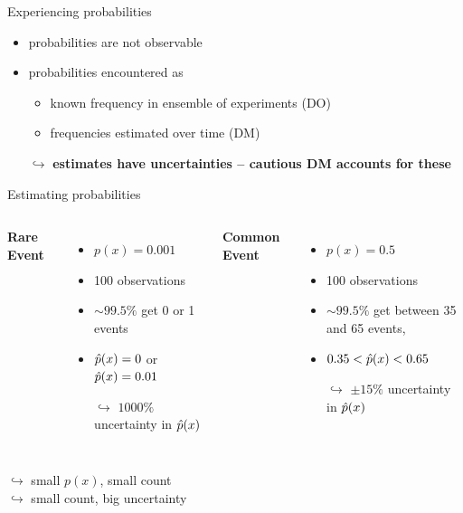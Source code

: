 \begin{frame}{Experiencing probabilities}

\begin{itemize}
  \item probabilities are not observable
  \item probabilities encountered as
  	\begin{itemize}
  		\item known frequency in ensemble of experiments (DO)
  		\item frequencies estimated over time (DM)
  	\end{itemize}
  \item[$\hookrightarrow$] \textbf{estimates have uncertainties -- cautious DM accounts for these}

\end{itemize}
\end{frame}


\begin{frame}{Estimating probabilities}
\begin{columns}[T]
\textbf{Rare Event} %
\begin{itemize}
  \item $p(x) = 0.001$
  \item \num{100} observations
  \item $\sim 99.5\%$ get 0 or 1 events
  \item $\hat{p}(x) = 0$ or $\hat{p}(x)=0.01$
  \item[$\hookrightarrow$] $\num{1000}\%$ uncertainty in $\hat{p}(x)$ 
\end{itemize}
\textbf{Common Event} %
\begin{itemize}
  \item $p(x)=0.5$
  \item \num{100} observations
  \item $\sim 99.5\%$ get between 35 and 65 events,
  \item $0.35< \hat{p}(x) <0.65$
  \item[$\hookrightarrow$] $\pm 15\%$ uncertainty in $\hat{p}(x)$
\end{itemize}
\end{columns}
\vspace{2em}
 \centering
$\hookrightarrow$ small $p(x)$, small count \\
$\hookrightarrow$ small count, big uncertainty
\end{frame}


